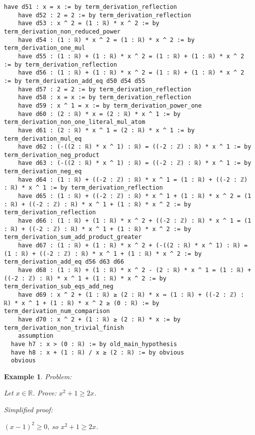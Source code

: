 \documentclass{article}
\newtheorem{example}{Example}
\begin{document}
\begin{tcolorbox}[colback=white!10, width=\linewidth]
\begin{lstlisting}[language=Lean4]
    have d51 : x = x := by term_derivation_reflection
    have d52 : 2 = 2 := by term_derivation_reflection
    have d53 : x ^ 2 = (1 : ℝ) * x ^ 2 := by term_derivation_non_reduced_power
    have d54 : (1 : ℝ) * x ^ 2 = (1 : ℝ) * x ^ 2 := by term_derivation_one_mul
    have d55 : (1 : ℝ) + (1 : ℝ) * x ^ 2 = (1 : ℝ) + (1 : ℝ) * x ^ 2 := by term_derivation_reflection
    have d56 : (1 : ℝ) + (1 : ℝ) * x ^ 2 = (1 : ℝ) + (1 : ℝ) * x ^ 2 := by term_derivation_add_eq d50 d54 d55
    have d57 : 2 = 2 := by term_derivation_reflection
    have d58 : x = x := by term_derivation_reflection
    have d59 : x ^ 1 = x := by term_derivation_power_one
    have d60 : (2 : ℝ) * x = (2 : ℝ) * x ^ 1 := by term_derivation_non_one_literal_mul_atom
    have d61 : (2 : ℝ) * x ^ 1 = (2 : ℝ) * x ^ 1 := by term_derivation_mul_eq
    have d62 : (-((2 : ℝ) * x ^ 1) : ℝ) = ((-2 : ℤ) : ℝ) * x ^ 1 := by term_derivation_neg_product
    have d63 : (-((2 : ℝ) * x ^ 1) : ℝ) = ((-2 : ℤ) : ℝ) * x ^ 1 := by term_derivation_neg_eq
    have d64 : (1 : ℝ) + ((-2 : ℤ) : ℝ) * x ^ 1 = (1 : ℝ) + ((-2 : ℤ) : ℝ) * x ^ 1 := by term_derivation_reflection
    have d65 : (1 : ℝ) + ((-2 : ℤ) : ℝ) * x ^ 1 + (1 : ℝ) * x ^ 2 = (1 : ℝ) + ((-2 : ℤ) : ℝ) * x ^ 1 + (1 : ℝ) * x ^ 2 := by term_derivation_reflection
    have d66 : (1 : ℝ) + (1 : ℝ) * x ^ 2 + ((-2 : ℤ) : ℝ) * x ^ 1 = (1 : ℝ) + ((-2 : ℤ) : ℝ) * x ^ 1 + (1 : ℝ) * x ^ 2 := by term_derivation_sum_add_product_greater
    have d67 : (1 : ℝ) + (1 : ℝ) * x ^ 2 + (-((2 : ℝ) * x ^ 1) : ℝ) = (1 : ℝ) + ((-2 : ℤ) : ℝ) * x ^ 1 + (1 : ℝ) * x ^ 2 := by term_derivation_add_eq d56 d63 d66
    have d68 : (1 : ℝ) + (1 : ℝ) * x ^ 2 - (2 : ℝ) * x ^ 1 = (1 : ℝ) + ((-2 : ℤ) : ℝ) * x ^ 1 + (1 : ℝ) * x ^ 2 := by term_derivation_sub_eqs_add_neg
    have d69 : x ^ 2 + (1 : ℝ) ≥ (2 : ℝ) * x ↔ (1 : ℝ) + ((-2 : ℤ) : ℝ) * x ^ 1 + (1 : ℝ) * x ^ 2 ≥ (0 : ℝ) := by term_derivation_num_comparison
    have d70 : x ^ 2 + (1 : ℝ) ≥ (2 : ℝ) * x := by term_derivation_non_trivial_finish
    assumption
  have h7 : x > (0 : ℝ) := by old_main_hypothesis
  have h8 : x + (1 : ℝ) / x ≥ (2 : ℝ) := by obvious
  obvious

\end{lstlisting}
\end{tcolorbox}


\begin{example}
Problem:
\begin{tcolorbox}[colback=yellow!10, width=\linewidth]
Let $x\in\mathbb{R}$. Prove: $x^2 + 1\ge 2x$.
\end{tcolorbox}

Simplified proof:
\begin{tcolorbox}[colback=blue!10, width=\linewidth]
$(x-1)^2 \ge 0$, so $x^2 + 1 \ge 2x$.
\end{tcolorbox}
\end{example}
\end{document}

